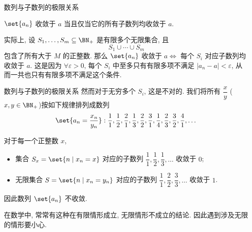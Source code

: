 \begin{frame}{数列与子数列的极限关系}
	\onslide<+->
	\begin{theorem}
		$\set{a_n}$ 收敛于 $a$ 当且仅当它的所有子数列均收敛于 $a$.
	\end{theorem}
	\onslide<+->
	实际上, 设 $S_1,\dots,S_m\subseteq\BN_+$ 是有限多个无限集合, 且
		\[S_1\cup\cdots\cup S_m\]
	包含了所有大于 $M$ 的正整数.
	\onslide<+->
	那么 $\set{a_n}$ 收敛于 $a\iff$ 每个 $S_i$ 对应子数列均收敛于 $a$.
	\onslide<+->
	这是因为 $\forall\varepsilon>0$, 每个 $S_i$ 中至多只有有限多项不满足 $|a_n-a|<\varepsilon$, 从而一共也只有有限多项不满足这个条件.
\end{frame}


\begin{frame}{数列与子数列的极限关系}	
	\onslide<+->
	然而对于无穷多个 $S_i$, 这是不对的.
	\onslide<+->
	我们将所有 $\dfrac xy$ ($x,y\in\BN_+$)按如下规律排列成数列
	\[\set{a_n=\frac{x_n}{y_n}}:\frac11,\frac12,\frac21,\frac13,\frac22,\frac31,\frac14,\frac23,\frac32,\frac41,\dots\]

	\onslide<+->
	对于每一个正整数 $x$,
	\begin{itemize}
		\item 集合 $S_x=\set{n\mid x_n=x}$ 对应的子数列 $\dfrac11,\dfrac12,\dfrac13,\dots$ 收敛于 $0$;
		\item 无限集合 $S=\set{n\mid x_n=y_n}$ 对应的子数列 $\dfrac11,\dfrac22,\dfrac33,\dots$ 收敛于 $1$.
	\end{itemize} 
	\onslide<+->
	因此数列 $\set{a_n}$ 不收敛.

	\onslide<+->
	在数学中, 常常有这种在有限情形成立, 无限情形不成立的结论. 因此遇到涉及无限的情形要小心.
\end{frame}

